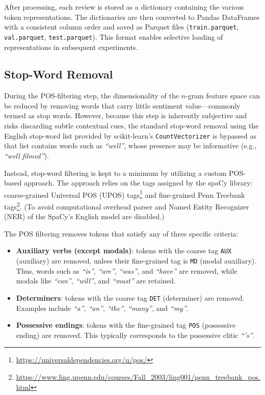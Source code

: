 \documentclass[a4paper,twoside,12pt]{book}
\newcommand{\postag}[1]{\texttt{#1}}
\newcommand{\code}[1]{\texttt{#1}}
\newcommand{\literal}[1]{\textit{``#1''}}
\begin{document}
After processing, each review is stored as a dictionary containing the various token representations. The dictionaries are then converted to Pandas DataFrames with a consistent column order and saved as Parquet files (\code{train.parquet}, \code{val.parquet}, \code{test.parquet}). This format enables selective loading of representations in subsequent experiments.

\subsection{Stop-Word Removal}
\label{sec:stop-word-removal}

During the POS-filtering step, the dimensionality of the $n$-gram feature space can be reduced by removing words that carry little sentiment value---commonly termed as stop words. However, because this step is inherently subjective and risks discarding subtle contextual cues, the standard stop-word removal using the English stop-word list provided by scikit-learn's \code{CountVectorizer} is bypassed as that list contains words such as \literal{well}, whose presence may be informative (e.g., \literal{well filmed}). 

Instead, stop-word filtering is kept to a minimum by utilizing a custom POS-based approach. The approach relies on the tags assigned by the spaCy library: coarse-grained Universal POS (UPOS) tags\footnote{\url{https://universaldependencies.org/u/pos/}} and fine-grained Penn Treebank tags\footnote{\url{https://www.ling.upenn.edu/courses/Fall_2003/ling001/penn_treebank_pos.html}}. (To avoid computational overhead parser and Named Entity Recognizer (NER) of the SpaCy's English model are disabled.) 

The POS filtering removes tokens that satisfy any of three specific criteria:

\begin{itemize}
	\item \textbf{Auxiliary verbs (except modals)}: tokens with the coarse tag \postag{AUX} (auxiliary) are removed, unless their fine-grained tag is \postag{MD} (modal auxiliary). Thus, words such as \literal{is}, \literal{are}, \literal{was}, and \literal{have} are removed, while modals like \literal{can}, \literal{will}, and \literal{must} are retained.
	\item \textbf{Determiners}: tokens with the coarse tag \postag{DET} (determiner) are removed. Examples include \literal{a}, \literal{an}, \literal{the}, \literal{many}, and \literal{my}.
	\item \textbf{Possessive endings}: tokens with the fine-grained tag \postag{POS} (possessive ending) are removed. This typically corresponds to the possessive clitic \literal{'s}.
\end{itemize}
\end{document}
